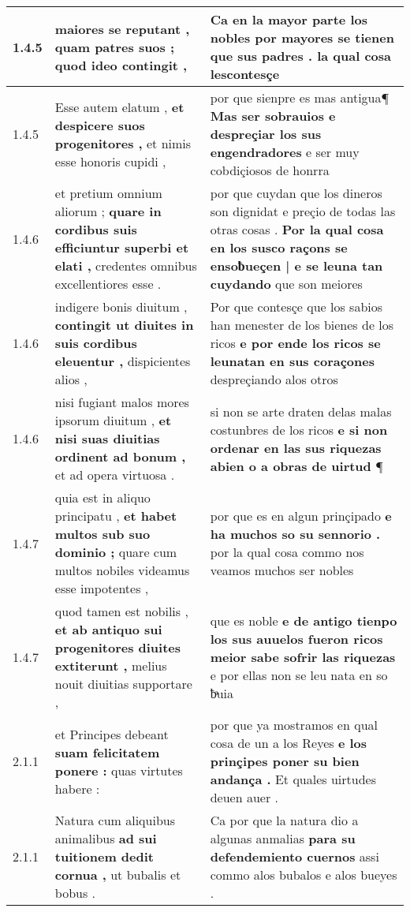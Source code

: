 \begin{tabular}{|p{1cm}|p{6.5cm}|p{6.5cm}|}
1.4.5 & maiores se reputant , \textbf{ quam patres suos ; } quod ideo contingit , & Ca en la mayor parte los nobles \textbf{ por mayores se tienen que sus padres . } la qual cosa lescontesçe \\\hline
1.4.5 & Esse autem elatum , \textbf{ et despicere suos progenitores , } et nimis esse honoris cupidi , & por que sienpre es mas antigua¶ \textbf{ Mas ser sobrauios e despreçiar los sus engendradores } e ser muy cobdiçiosos de honrra \\\hline
1.4.6 & et pretium omnium aliorum ; \textbf{ quare in cordibus suis efficiuntur superbi et elati , } credentes omnibus excellentiores esse . & por que cuydan que los dineros son dignidat e preçio de todas las otras cosas . \textbf{ Por la qual cosa en los susco raçons se ensoƀueçen | e se leuna tan cuydando } que son meiores \\\hline
1.4.6 & indigere bonis diuitum , \textbf{ contingit ut diuites in suis cordibus eleuentur , } dispicientes alios , & Por que contesçe que los sabios han menester de los bienes de los ricos \textbf{ e por ende los ricos se leunatan en sus coraçones } despreçiando alos otros \\\hline
1.4.6 & nisi fugiant malos mores ipsorum diuitum , \textbf{ et nisi suas diuitias ordinent ad bonum , } et ad opera virtuosa . & si non se arte draten delas malas costunbres de los ricos \textbf{ e si non ordenar en las sus riquezas abien o a obras de uirtud } ¶ \\\hline
1.4.7 & quia est in aliquo principatu , \textbf{ et habet multos sub suo dominio ; } quare cum multos nobiles videamus esse impotentes , & por que es en algun prinçipado \textbf{ e ha muchos so su sennorio . } por la qual cosa commo nos veamos muchos ser nobles \\\hline
1.4.7 & quod tamen est nobilis , \textbf{ et ab antiquo sui progenitores diuites extiterunt , } melius nouit diuitias supportare , & que es noble \textbf{ e de antigo tienpo los sus auuelos fueron ricos meior sabe sofrir las riquezas } e por ellas non se leu nata en so ƀͣuia \\\hline
2.1.1 & et Principes debeant \textbf{ suam felicitatem ponere : } quas virtutes habere : & por que ya mostramos en qual cosa de un a los Reyes \textbf{ e los prinçipes poner su bien andança . } Et quales uirtudes deuen auer . \\\hline
2.1.1 & Natura cum aliquibus animalibus \textbf{ ad sui tuitionem dedit cornua , } ut bubalis et bobus . & Ca por que la natura dio a algunas anmalias \textbf{ para su defendemiento cuernos } assi commo alos bubalos e alos bueyes . \\\hline

\end{tabular}
